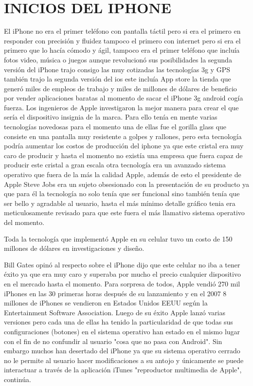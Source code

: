 \section*{INICIOS DEL IPHONE}

El iPhone no era el primer teléfono con pantalla táctil pero si
era el primero en responder con precisión y fluidez tampoco el
primero con internet pero si era el primero que lo hacía cómodo
y ágil, tampoco era el primer teléfono que incluía fotos video,
música o juegos aunque revolucionó sus posibilidades la
segunda versión del iPhone trajo consigo las muy cotizadas las
tecnologías 3g y GPS también trajo la segunda versión del ios
este incluía App store la tienda que generó miles de empleos de
trabajo y miles de millones de dólares de beneficio por vender
aplicaciones baratas al momento de sacar el iPhone 3g android
cogía fuerza.
Los ingenieros de Apple investigaron la mejor manera para
crear el que sería el dispositivo insignia de la marca. Para ello
tenía en mente varias tecnologías novedosas para el momento
una de ellas fue el gorilla glass que consiste en una pantalla muy
resistente a golpes y rallones, pero esta tecnología podría
aumentar los costos de producción del iphone ya que este cristal
era muy caro de producir y hasta el momento no existía una
empresa que fuera capaz de producir este cristal a gran escala
otra tecnología era un avanzado sistema operativo que fuera de
la más la calidad Apple, además de esto el presidente de Apple
Steve Jobs era un sujeto obsesionado con la presentación de su
producto ya que para él la tecnología no solo tenía que ser
funcional sino también tenía que ser bello y agradable al
usuario, hasta el más mínimo detalle gráfico tenia era
meticulosamente revisado para que este fuera el más llamativo
sistema operativo del momento.

Toda la tecnología que implementó Apple en su celular tuvo un
costo de 150 millones de dólares en investigaciones y diseño.

Bill Gates opinó al respecto sobre el iPhone dijo que este celular
no iba a tener éxito ya que era muy caro y superaba por mucho
el precio cualquier dispositivo en el mercado hasta el momento.
Para sorpresa de todos, Apple vendió 270 mil iPhones en las 30
primeras horas después de su lanzamiento y en el 2007 8
millones de iPhones se vendieron en Estados Unidos EEUU
según la Entertainment Software Association. Luego de su éxito
Apple lanzó varias versiones pero cada una de ellas ha tenido la
particularidad de que todas sus configuraciones (botones) en el
sistema operativo han estado en el mismo lugar con el fin de no
confundir al usuario "cosa que no pasa con Android". Sin
embargo muchos han desertado del iPhone ya que su sistema
operativo cerrado no le permite al usuario hacer modificaciones
a su antojo y únicamente se puede interactuar a través de la
aplicación iTunes "reproductor multimedia de Apple",
continúa.

